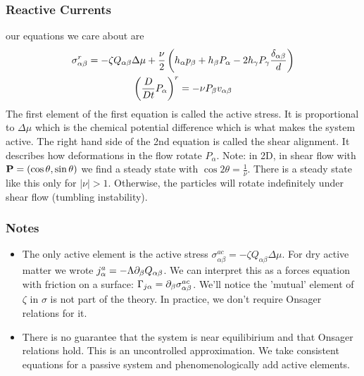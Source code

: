 \subsubsection{Reactive Currents}
our equations we care about are
\begin{gather}
    \sigma_{\alpha\beta}^r = -\zeta Q_{\alpha\beta} \Delta\mu  + \frac{\nu}{2}\left(h_\alpha p_\beta+h_\beta P_\alpha -2h_\gamma P_\gamma\frac{\delta_{\alpha\beta}}{d}\right) \\
    \left(\frac{D}{Dt}P_\alpha\right)^r = -\nu P_\beta v_{\alpha\beta}
\end{gather}
The first element of the first equation is called the active stress. It is proportional to \(\Delta\mu \) which is the chemical potential difference which is what makes the system active. The right hand side of the 2nd equation is called the shear alignment. It describes how deformations in the flow rotate \(P_\alpha \). Note: in 2D, in shear flow with \(\mathbf{P} = \left(\cos\theta,\sin\theta\right)\) we find a steady state with \(\cos2\theta = \frac{1}{\nu}\). There is a steady state like this only for \(\lvert\nu\rvert > 1\). Otherwise, the particles will rotate indefinitely under shear flow (tumbling instability).
\subsubsection{Notes}
\begin{itemize}
    \item The only active element is the active stress \(\sigma_{\alpha\beta}^{ac} = -\zeta Q_{\alpha\beta}\Delta\mu \). For dry active matter we wrote \(j_\alpha^a = - \Lambda\partial_\beta Q_{\alpha\beta}\). We can interpret this as a forces equation with friction on a surface: \(\Gamma_{j\alpha} = \partial_\beta\sigma_{\alpha\beta}^{ac}\). We'll notice the 'mutual' element of \(\zeta \) in \(\sigma \) is not part of the theory. In practice, we don't require Onsager relations for it.
    \item There is no guarantee that the system is near equilibirium and that Onsager relations hold. This is an uncontrolled approximation. We take consistent equations for a passive system and phenomenologically add active elements.
\end{itemize}
